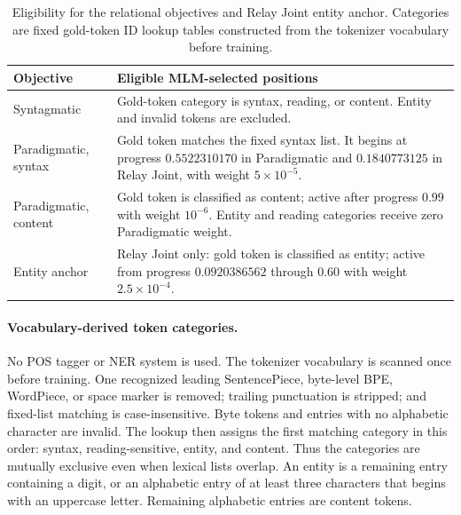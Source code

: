 \begin{table}[H]
\centering
\small
\setlength{\tabcolsep}{4pt}
\begin{tabular}{p{}p{}}
\toprule
Objective & Eligible MLM-selected positions \\
\midrule
Syntagmatic & Gold-token category is syntax, reading, or content. Entity and invalid tokens are excluded. \\
Paradigmatic, syntax & Gold token matches the fixed syntax list. It begins at progress $0.5522310170$ in Paradigmatic and $0.1840773125$ in Relay Joint, with weight $5\times10^{-5}$. \\
Paradigmatic, content & Gold token is classified as content; active after progress $0.99$ with weight $10^{-6}$. Entity and reading categories receive zero Paradigmatic weight. \\
Entity anchor & Relay Joint only: gold token is classified as entity; active from progress $0.0920386562$ through $0.60$ with weight $2.5\times10^{-4}$. \\
\bottomrule
\end{tabular}
\caption{Eligibility for the relational objectives and Relay Joint
entity anchor. Categories are fixed gold-token ID lookup tables
constructed from the tokenizer vocabulary before training.}
\label{tab:token-eligibility}
\end{table}

\paragraph{Vocabulary-derived token categories.}
No POS tagger or NER system is used. The tokenizer vocabulary is
scanned once before training. One recognized leading SentencePiece,
byte-level BPE, WordPiece, or space marker is removed; trailing
punctuation is stripped; and fixed-list matching is case-insensitive.
Byte tokens and entries with no alphabetic character are invalid.
The lookup then assigns the first matching category in this order:
syntax, reading-sensitive, entity, and content. Thus the categories are
mutually exclusive even when lexical lists overlap. An entity is a
remaining entry containing a digit, or an alphabetic entry of at least
three characters that begins with an uppercase letter. Remaining
alphabetic entries are content tokens.

